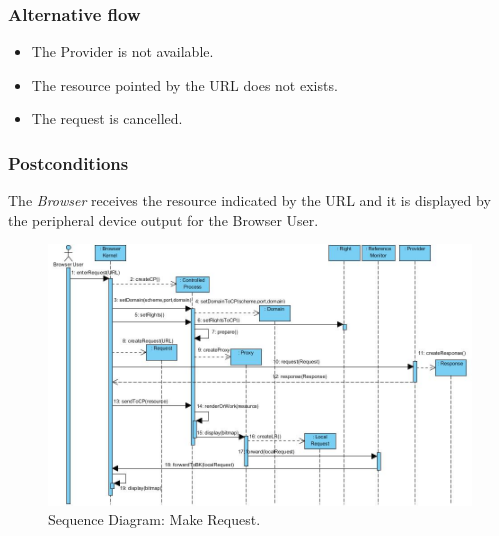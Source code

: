 \documentclass{sig-alternate-05-2015}
\begin{document}
    \subsubsection*{Alternative flow} 
    \begin{itemize}
    \item The Provider is not available.
    \item The resource pointed by the URL does not exists.
    \item The request is cancelled.
      \end{itemize}
    \subsubsection*{Postconditions} The \textit{Browser} receives the resource indicated by the URL and it is displayed by the peripheral device output for the Browser User.
      \begin{figure}[h!t]
          \centering
          \includegraphics[scale=0.53]{figures/BI/MakeRequest-v3_original.jpg}
          \caption{Sequence Diagram: Make Request.}
          \label{fig:SecReq}
      \end{figure}
\end{document}
